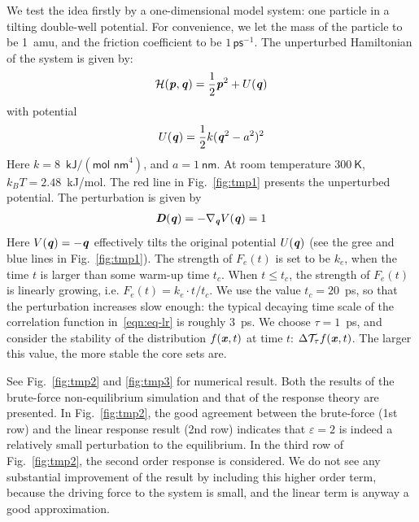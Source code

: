 \documentclass[aip,jcp,a4paper,reprint,onecolumn]{revtex4-1}
\newcommand{\vect}[1]{\textbf{\textit{#1}}}
\newcommand{\mh}{\mathcal H}
\newcommand{\eps}{\varepsilon}
\newcommand{\mt}{\mathcal T}
\begin{document}
We test the idea firstly by a one-dimensional model system: one particle in a
tilting double-well potential. For convenience, we let the mass of the
particle to be 1~\textsf{amu},
and the friction coefficient to be $1\,\textsf{ps}^{-1}$.
The unperturbed
Hamiltonian of the system is given by:
\begin{align}
  \mh (\vect p, \vect q) = \frac 12 \vect p^2 + U(\vect q) 
\end{align}
with potential
\begin{align}
  U(\vect q) = \frac12 k (\vect q^2 - a^2)^2
\end{align}
Here $k = 8$~$\textsf{kJ} / (\textsf{mol nm}^4)$, and $ a = 1\ \textsf{nm}$.
At room temperature $300\ \textsf{K}$, $k_BT = 2.48$~\textsf{kJ/mol}.
The red line in Fig.~\ref{fig:tmp1} presents the unperturbed potential.
The perturbation is given by
\begin{align}
  \vect D(\vect q) = -\nabla_{\vect q} V(\vect q) = 1
\end{align}
Here $V(\vect q) = -\vect q$   effectively tilts the original
potential $U(\vect q)$ (see the gree and blue lines in Fig.~\ref{fig:tmp1}).
The strength of $F_e(t)$ is
set to be $k_e$, when the time $t$ is larger than some warm-up time $t_c$.
When $t \leq t_c$, the strength of $F_e(t)$ is linearly growing,
i.e. $ F_e(t) = k_e\cdot t/t_c$.
We use the value $t_c = 20$~\textsf{ps}, so that the perturbation increases slow
enough: the typical decaying time scale of the correlation function
in~\eqref{eqn:eq-lr} is roughly 3~\textsf{ps}.
We choose $\tau = 1$~\textsf{ps}, and
consider the stability of the
distribution $f(\vect x, t)$ at time $t$: $\Delta\mt_\tau f(\vect x, t)$.
The larger
this value, the more stable the core sets are.

See Fig.~\ref{fig:tmp2} and \ref{fig:tmp3} for numerical result.  Both
the results of the brute-force non-equilibrium simulation
and that of the response theory are presented.
In Fig.~\ref{fig:tmp2},
the good agreement between the brute-force (1st row)
and the linear response result (2nd row) indicates that $\eps = 2$ is
indeed a relatively small perturbation to the equilibrium.
In the third row of Fig.~\ref{fig:tmp2},
the second order response is considered. We do not see any
substantial improvement of the result by including this higher order term,
because the
driving force to the system is small,
and the linear term is anyway a good approximation.
\end{document}
